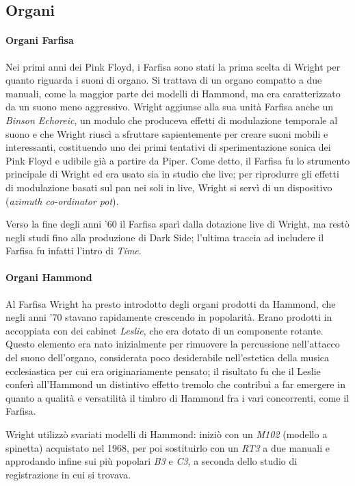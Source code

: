 \documentclass[class=book, crop=false, oneside, 12pt]{standalone}
\begin{document}
    \subsection{Organi}
    \paragraph{Organi Farfisa}
    Nei primi anni dei Pink Floyd, i Farfisa sono stati la prima scelta di Wright per quanto riguarda i suoni di organo. Si trattava di un organo compatto a due manuali, come la maggior parte dei modelli di Hammond, ma era caratterizzato da un suono meno aggressivo. Wright aggiunse alla sua unità Farfisa anche un \emph{Binson Echoreic}, un modulo che produceva effetti di modulazione temporale al suono e che Wright riuscì a sfruttare sapientemente per creare suoni mobili e interessanti, costituendo uno dei primi tentativi di sperimentazione sonica dei Pink Floyd e udibile già a partire da Piper. Come detto, il Farfisa fu lo strumento principale di Wright ed era usato sia in studio che live; per riprodurre gli effetti di modulazione basati sul pan nei soli in live, Wright si servì di un dispositivo (\emph{azimuth co-ordinator pot}).

    Verso la fine degli anni '60 il Farfisa sparì dalla dotazione live di Wright, ma restò negli studi fino alla produzione di Dark Side; l'ultima traccia ad includere il Farfisa fu infatti l'intro di \emph{Time}.

    \paragraph{Organi Hammond}
    Al Farfisa Wright ha presto introdotto degli organi prodotti da Hammond, che negli anni '70 stavano rapidamente crescendo in popolarità. Erano prodotti in accoppiata con dei cabinet \emph{Leslie}, che era dotato di un componente rotante. Questo elemento era nato inizialmente per rimuovere la percussione nell'attacco del suono dell'organo, considerata poco desiderabile nell'estetica della musica ecclesiastica per cui era originariamente pensato; il risultato fu che il Leslie conferì all'Hammond un distintivo effetto tremolo che contribuì a far emergere in quanto a qualità e versatilità il timbro di Hammond fra i vari concorrenti, come il Farfisa.

    Wright utilizzò svariati modelli di Hammond: iniziò con un \emph{M102} (modello a spinetta) acquistato nel 1968, per poi sostituirlo con un \emph{RT3} a due manuali e approdando infine sui più popolari \emph{B3} e \emph{C3}, a seconda dello studio di registrazione in cui si trovava.
    
\end{document}
